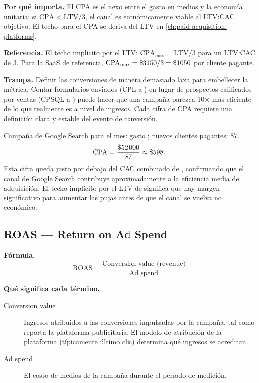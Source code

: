 \textbf{Por qué importa.} El CPA es el nexo entre el gasto en medios y la economía unitaria:
si $\mathrm{CPA} < \mathrm{LTV}/3$, el canal es económicamente viable al LTV:CAC objetivo.
El techo para el CPA se deriva del LTV en \cref{ch:paid-acquisition-platforms}.

\textbf{Referencia.} El techo implícito por el LTV: $\mathrm{CPA}_{\max} = \mathrm{LTV} / 3$
para un LTV:CAC de 3. Para la SaaS de referencia,
$\mathrm{CPA}_{\max} = \$\num{3150}/3 = \$\num{1050}$ por cliente pagante.

\textbf{Trampa.} Definir las conversiones de manera demasiado laxa para embellecer la
métrica. Contar formularios enviados (CPL a ) en lugar de prospectos calificados
por ventas (CPSQL a ) puede hacer que una campaña parezca 10$\times$ más eficiente
de lo que realmente es a nivel de ingresos. Cada cifra de CPA requiere una definición clara
y estable del evento de conversión.

\begin{example}
Campaña de Google Search para el mes: gasto ; nuevos clientes pagantes: 87.
\[
  \mathrm{CPA} = \frac{\$\num{52000}}{87} \approx \$\num{598}.
\]
Esta cifra queda justo por debajo del CAC combinado de , confirmando que el canal
de Google Search contribuye aproximadamente a la eficiencia media de adquisición. El techo
implícito por el LTV de  significa que hay margen significativo para aumentar las
pujas antes de que el canal se vuelva no económico.
\end{example}


\subsection{ROAS --- Return on Ad Spend}

\textbf{Fórmula.}
\[
  \mathrm{ROAS} = \frac{\text{Conversion value (revenue)}}{\text{Ad spend}}
\]

\textbf{Qué significa cada término.}
\begin{description}
  \item[Conversion value] Ingresos atribuidos a las conversiones impulsadas por la campaña,
    tal como reporta la plataforma publicitaria. El modelo de atribución de la plataforma
    (típicamente último clic) determina qué ingresos se acreditan.
  \item[Ad spend] El costo de medios de la campaña durante el período de medición.
\end{description}


